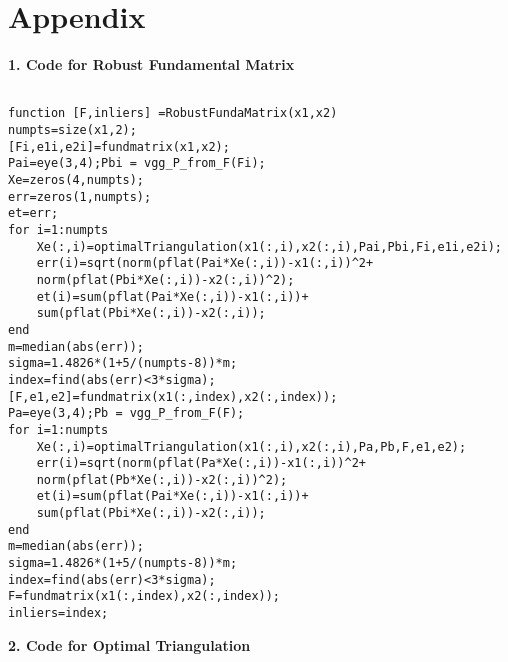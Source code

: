 \chapter{Appendix}
\label{sec:A}
\textbf{1. Code for Robust Fundamental Matrix}
\begin{lstlisting}

function [F,inliers] =RobustFundaMatrix(x1,x2)
numpts=size(x1,2);
[Fi,e1i,e2i]=fundmatrix(x1,x2);
Pai=eye(3,4);Pbi = vgg_P_from_F(Fi);
Xe=zeros(4,numpts);
err=zeros(1,numpts);
et=err;
for i=1:numpts
    Xe(:,i)=optimalTriangulation(x1(:,i),x2(:,i),Pai,Pbi,Fi,e1i,e2i);
    err(i)=sqrt(norm(pflat(Pai*Xe(:,i))-x1(:,i))^2+
    norm(pflat(Pbi*Xe(:,i))-x2(:,i))^2);
    et(i)=sum(pflat(Pai*Xe(:,i))-x1(:,i))+
    sum(pflat(Pbi*Xe(:,i))-x2(:,i));
end
m=median(abs(err));
sigma=1.4826*(1+5/(numpts-8))*m;
index=find(abs(err)<3*sigma);
[F,e1,e2]=fundmatrix(x1(:,index),x2(:,index));
Pa=eye(3,4);Pb = vgg_P_from_F(F);
for i=1:numpts
    Xe(:,i)=optimalTriangulation(x1(:,i),x2(:,i),Pa,Pb,F,e1,e2);        
    err(i)=sqrt(norm(pflat(Pa*Xe(:,i))-x1(:,i))^2+
    norm(pflat(Pb*Xe(:,i))-x2(:,i))^2);
    et(i)=sum(pflat(Pai*Xe(:,i))-x1(:,i))+
    sum(pflat(Pbi*Xe(:,i))-x2(:,i));
end
m=median(abs(err));
sigma=1.4826*(1+5/(numpts-8))*m;
index=find(abs(err)<3*sigma);
F=fundmatrix(x1(:,index),x2(:,index));
inliers=index;

\end{lstlisting}

\label{sec:B}
\textbf{2. Code for Optimal Triangulation}

